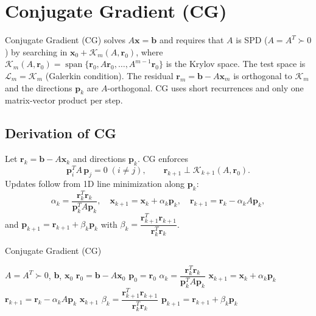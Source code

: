 \section{Conjugate Gradient (CG)}

Conjugate Gradient (CG) solves $A\mathbf{x}=\mathbf{b}$ and requires that $A$ is SPD ($A=A^T\succ0$) by searching in $\mathbf{x}_0+\mathcal{K}_m(A,\mathbf{r}_0)$, where $\mathcal{K}_m(A,\mathbf{r}_0)=\operatorname{span}\{\mathbf{r}_0,A\mathbf{r}_0,\ldots,A^{m-1}\mathbf{r}_0\}$ is the Krylov space. The test space is $\mathcal{L}_m=\mathcal{K}_m$ (Galerkin condition). The residual $\mathbf{r}_m=\mathbf{b}-A\mathbf{x}_m$ is orthogonal to $\mathcal{K}_m$ and the directions $\mathbf{p}_k$ are $A$-orthogonal. CG uses short recurrences and only one matrix-vector product per step.

\subsection{Derivation of CG}
Let $\mathbf{r}_k=\mathbf{b}-A\mathbf{x}_k$ and directions $\mathbf{p}_k$. CG enforces
\[
  \mathbf{p}_i^T A\,\mathbf{p}_j=0\;(i\ne j),\qquad \mathbf{r}_{k+1}\perp \mathcal{K}_{k+1}(A,\mathbf{r}_0).
\]
Updates follow from 1D line minimization along $\mathbf{p}_k$:
\[
  \alpha_k=\frac{\mathbf{r}_k^T\mathbf{r}_k}{\mathbf{p}_k^T A\mathbf{p}_k},\quad \mathbf{x}_{k+1}=\mathbf{x}_k+\alpha_k\mathbf{p}_k,\quad \mathbf{r}_{k+1}=\mathbf{r}_k-\alpha_k A\mathbf{p}_k,
\]
and $\mathbf{p}_{k+1}=\mathbf{r}_{k+1}+\beta_k\mathbf{p}_k$ with $\beta_k=\dfrac{\mathbf{r}_{k+1}^T\mathbf{r}_{k+1}}{\mathbf{r}_k^T\mathbf{r}_k}$.

\begin{algorithm}[H]
  \caption{Conjugate Gradient (CG)}
  \label{alg:cg}
  \begin{algorithmic}[0]
    \Require $A=A^T\succ0$, $\mathbf{b}$, $\mathbf{x}_0$
    \State $\mathbf{r}_0=\mathbf{b}-A\mathbf{x}_0$
    \State $\mathbf{p}_0=\mathbf{r}_0$
    \State $\alpha_k=\dfrac{\mathbf{r}_k^T\mathbf{r}_k}{\mathbf{p}_k^T A\mathbf{p}_k}$
    \State $\mathbf{x}_{k+1}=\mathbf{x}_k+\alpha_k\mathbf{p}_k$
    \State $\mathbf{r}_{k+1}=\mathbf{r}_k-\alpha_k A\mathbf{p}_k$
     \Return $\mathbf{x}_{k+1}$ \EndIf
    \State $\beta_k=\dfrac{\mathbf{r}_{k+1}^T\mathbf{r}_{k+1}}{\mathbf{r}_k^T\mathbf{r}_k}$
    \State $\mathbf{p}_{k+1}=\mathbf{r}_{k+1}+\beta_k\mathbf{p}_k$
    \EndFor
  \end{algorithmic}
\end{algorithm}

